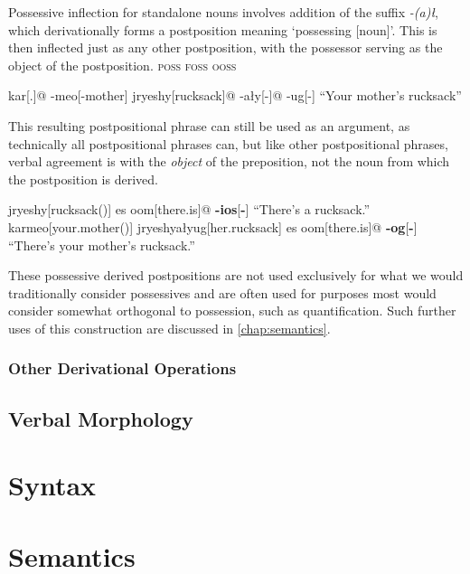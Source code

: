 \documentclass[a4paper,11pt,oneside,openany]{memoir}
\begin{document}
Possessive inflection for standalone nouns involves addition of the suffix \textit{-(a)\l}, which derivationally forms a postposition meaning `possessing [noun]'. This is then inflected just as any other postposition, with the possessor serving as the object of the postposition. \textsc{poss} \textsc{foss} \textsc{ooss}

\ex
\begingl
kar[\Second.\Poss]@
-meo[-mother]
jryeshy[rucksack]@
-a\l y[-\Poss]@
-ug[-\ToGob]
\glft
``Your mother's rucksack''
\endgl
\xe

This resulting postpositional phrase can still be used as an argument, as technically all postpositional phrases can, but like other postpositional phrases, verbal agreement is with the \emph{object} of the preposition, not the noun from which the postposition is derived.

\pex
\a
\begingl
jryeshy[rucksack(\Inan)]
es oom[there.is]@
\textbf{-ios}[\textbf{-\ToInan}]
\glft
``There's a rucksack.''
\endgl
\a
\begingl
karmeo[your.mother(\Gob)]
jryeshya\l yug[her.rucksack]
es oom[there.is]@
\textbf{-og}[\textbf{-\ToGob}]
\glft
``There's your mother's rucksack.''
\endgl
\xe

These possessive derived postpositions are not used exclusively for what we would traditionally consider possessives and are often used for purposes most would consider somewhat orthogonal to possession, such as quantification. Such further uses of this construction are discussed in \autoref{chap:semantics}.

\subsection{Other Derivational Operations}

\section{Verbal Morphology}

\chapter{Syntax}\label{chap:syntax}

\chapter{Semantics}\label{chap:semantics}


\end{document}
